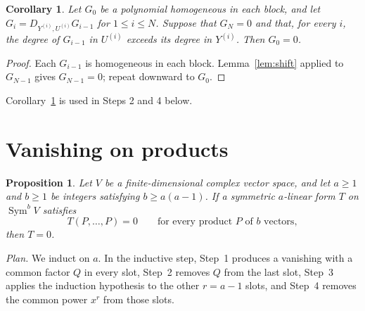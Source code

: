 \documentclass[11pt]{article}
\newtheorem{corollary}[theorem]{Corollary}
\newtheorem{proposition}[theorem]{Proposition}
\theoremstyle{remark}
\DeclareMathOperator{\Sym}{Sym}
\newcommand{\D}[2]{D_{#1,#2}}
\begin{document}
\begin{corollary}\label{cor:chain}
Let $G_0$ be a polynomial homogeneous in each block, and let
$G_i=\D{Y^{(i)}}{U^{(i)}}G_{i-1}$ for $1\le i\le N$. Suppose that $G_N=0$ and
that, for every $i$, the degree of $G_{i-1}$ in $U^{(i)}$ exceeds its degree
in $Y^{(i)}$. Then $G_0=0$.
\end{corollary}

\begin{proof}
Each $G_{i-1}$ is homogeneous in each block. Lemma~\ref{lem:shift} applied to
$G_{N-1}$ gives $G_{N-1}=0$; repeat downward to $G_0$.
\end{proof}

Corollary~\ref{cor:chain} is used in Steps 2 and 4 below.

\section{Vanishing on products}\label{sec:vanishing}

\begin{proposition}\label{prop:vanishing}
Let $V$ be a finite-dimensional complex vector space, and let $a\ge1$ and
$b\ge1$ be integers satisfying $b\ge a(a-1)$.
If a symmetric $a$-linear form $T$ on $\Sym^b V$ satisfies
\begin{equation}\label{eq:diagonal}
 T(P,\ldots,P)=0
 \qquad\text{for every product $P$ of $b$ vectors},
\end{equation}
then $T=0$.
\end{proposition}

\emph{Plan.} We induct on $a$. In the inductive step, Step~1 produces a
vanishing with a common factor $Q$ in every slot, Step~2 removes $Q$ from the
last slot, Step~3 applies the induction hypothesis to the other $r=a-1$
slots, and Step~4 removes the common power $x^r$ from those slots.
\end{document}
